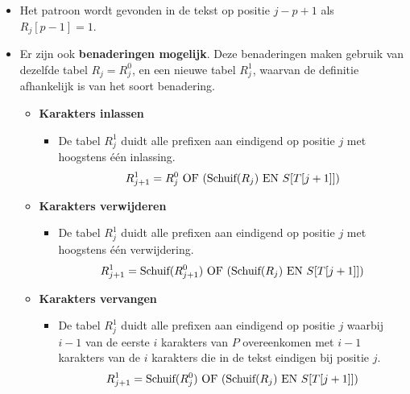 \begin{itemize}
    \item Het patroon wordt gevonden in de tekst op positie $j - p + 1$ als $R_j[p - 1] = 1$.

    \item Er zijn ook \textbf{benaderingen mogelijk}. Deze benaderingen maken gebruik van dezelfde tabel $R_j = R^0_j$, en een nieuwe tabel $R^1_j$, waarvan de definitie afhankelijk is van het soort benadering. 
    \begin{itemize}
        \item \textbf{Karakters inlassen} 
        \begin{itemize}
            \item De tabel $R^1_j$ duidt alle prefixen aan eindigend op positie $j$ met hoogstens één inlassing.
            $$R^1_{j + 1} = R^0_j \hbox{ OF }(\hbox{Schuif}(R_j) \hbox{ EN } S[T[j + 1]]) $$
        \end{itemize}
        \item \textbf{Karakters verwijderen} 
        \begin{itemize}
            \item De tabel $R^1_j$ duidt alle prefixen aan eindigend op positie $j$  met hoogstens één verwijdering.
            $$R^1_{j + 1} = \hbox{Schuif}(R^0_{j+1}) \hbox{ OF }(\hbox{Schuif}(R_j) \hbox{ EN } S[T[j + 1]]) $$
        \end{itemize}
        \item \textbf{Karakters vervangen}
        \begin{itemize}
            \item De tabel $R^1_j$ duidt alle prefixen aan eindigend op positie $j$ waarbij $i - 1$ van de eerste $i$ karakters van $P$ overeenkomen met $i - 1$ karakters van de $i$ karakters die in de tekst eindigen bij positie $j$.
            $$R^1_{j + 1} = \hbox{Schuif}(R^0_{j}) \hbox{ OF }(\hbox{Schuif}(R_j) \hbox{ EN } S[T[j + 1]]) $$
        \end{itemize}
    \end{itemize}
\end{itemize}

